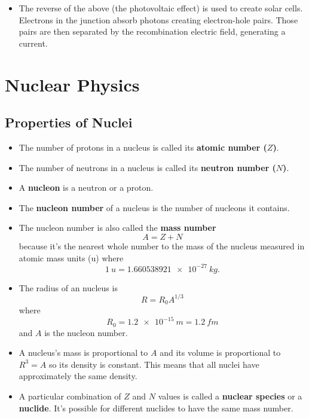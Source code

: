 \documentclass{article}
\begin{document}
\begin{itemize}
  \item The reverse of the above (the photovoltaic effect) is used to create solar cells. Electrons in the junction absorb photons creating electron-hole pairs. Those pairs are then separated by the recombination electric field, generating a current.
\end{itemize}

\section{Nuclear Physics}

\subsection{Properties of Nuclei}

\begin{itemize}
  \item The number of protons in a nucleus is called its \textbf{atomic number ($Z$)}.

  \item The number of neutrons in a nucleus is called its \textbf{neutron number ($N$)}.

  \item A \textbf{nucleon} is a neutron or a proton.

  \item The \textbf{nucleon number} of a nucleus is the number of nucleons it contains.

  \item The nucleon number is also called the \textbf{mass number} \[A = Z + N\] because it's the nearest whole number to the mass of the nucleus measured in atomic mass units (u) where \[\qty{1}{u} = \qty{1.660538921e-27}{kg}.\]

  \item The radius of an nucleus is \[R = R_0 A^{1 / 3}\] where \[R_0 = \qty{1.2e-15}{m} = \qty{1.2}{fm}\] and $A$ is the nucleon number.

  \item A nucleus's mass is proportional to $A$ and its volume is proportional to $R^3 = A$ so its density is constant. This means that all nuclei have approximately the same density.

  \item A particular combination of $Z$ and $N$ values is called a \textbf{nuclear species} or a \textbf{nuclide}. It's possible for different nuclides to have the same mass number.


\end{itemize}
\end{document}
